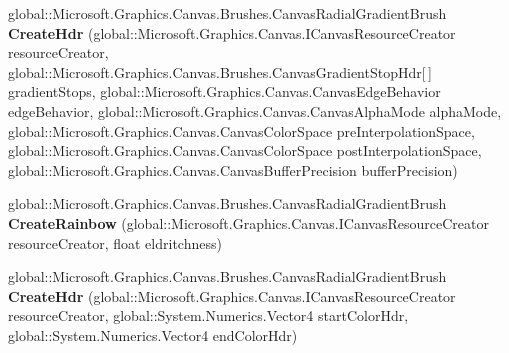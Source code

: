 \begin{DoxyCompactItemize}
\item 
\mbox{\label{interface_microsoft_1_1_graphics_1_1_canvas_1_1_brushes_1_1_i_canvas_radial_gradient_brush_statics_a86665bd26bca12d2ecfcc18dc1a6ae1a}} 
global\+::\+Microsoft.\+Graphics.\+Canvas.\+Brushes.\+Canvas\+Radial\+Gradient\+Brush {\bfseries Create\+Hdr} (global\+::\+Microsoft.\+Graphics.\+Canvas.\+I\+Canvas\+Resource\+Creator resource\+Creator, global\+::\+Microsoft.\+Graphics.\+Canvas.\+Brushes.\+Canvas\+Gradient\+Stop\+Hdr\mbox{[}$\,$\mbox{]} gradient\+Stops, global\+::\+Microsoft.\+Graphics.\+Canvas.\+Canvas\+Edge\+Behavior edge\+Behavior, global\+::\+Microsoft.\+Graphics.\+Canvas.\+Canvas\+Alpha\+Mode alpha\+Mode, global\+::\+Microsoft.\+Graphics.\+Canvas.\+Canvas\+Color\+Space pre\+Interpolation\+Space, global\+::\+Microsoft.\+Graphics.\+Canvas.\+Canvas\+Color\+Space post\+Interpolation\+Space, global\+::\+Microsoft.\+Graphics.\+Canvas.\+Canvas\+Buffer\+Precision buffer\+Precision)
\item 
\mbox{\label{interface_microsoft_1_1_graphics_1_1_canvas_1_1_brushes_1_1_i_canvas_radial_gradient_brush_statics_a7dd980a2771ddc006a4a8a3c925e1be7}} 
global\+::\+Microsoft.\+Graphics.\+Canvas.\+Brushes.\+Canvas\+Radial\+Gradient\+Brush {\bfseries Create\+Rainbow} (global\+::\+Microsoft.\+Graphics.\+Canvas.\+I\+Canvas\+Resource\+Creator resource\+Creator, float eldritchness)
\item 
\mbox{\label{interface_microsoft_1_1_graphics_1_1_canvas_1_1_brushes_1_1_i_canvas_radial_gradient_brush_statics_a33c22a712d4ae1fd59611737c9f40f6b}} 
global\+::\+Microsoft.\+Graphics.\+Canvas.\+Brushes.\+Canvas\+Radial\+Gradient\+Brush {\bfseries Create\+Hdr} (global\+::\+Microsoft.\+Graphics.\+Canvas.\+I\+Canvas\+Resource\+Creator resource\+Creator, global\+::\+System.\+Numerics.\+Vector4 start\+Color\+Hdr, global\+::\+System.\+Numerics.\+Vector4 end\+Color\+Hdr)
\item 
\mbox{\label{interface_microsoft_1_1_graphics_1_1_canvas_1_1_brushes_1_1_i_canvas_radial_gradient_brush_statics_a875dc22871a8814a201d278d00a3844f}} 

\end{DoxyCompactItemize}
